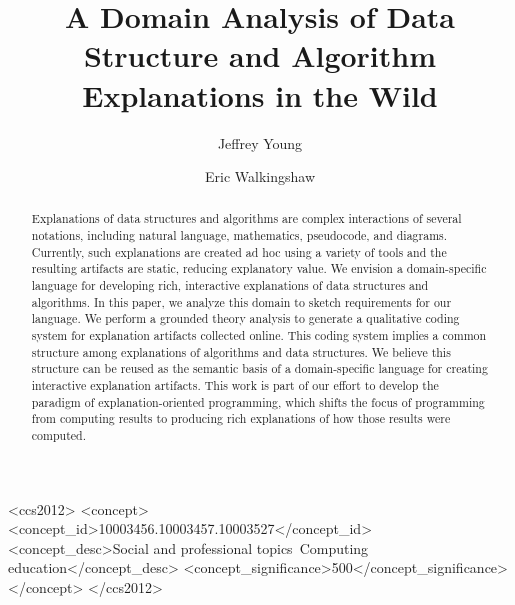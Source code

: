 \documentclass[sigconf]{acmart}
\begin{document}
\title{A Domain Analysis of Data Structure and Algorithm Explanations in the Wild}



% 

\begin{CCSXML}
<ccs2012>
<concept>
<concept_id>10003456.10003457.10003527</concept_id>
<concept_desc>Social and professional topics~Computing education</concept_desc>
<concept_significance>500</concept_significance>
</concept>
</ccs2012>
\end{CCSXML}



\author{Jeffrey Young} 
\author{Eric Walkingshaw} 

\begin{abstract}
%
Explanations of data structures and algorithms are complex interactions of
several notations, including natural language, mathematics, pseudocode, and
diagrams. Currently, such explanations are created ad hoc using a variety of
tools and the resulting artifacts are static, reducing explanatory value. We
envision a domain-specific language for developing rich, interactive
explanations of data structures and algorithms. In this paper, we analyze this
domain to sketch requirements for our language. We perform a grounded theory
analysis to generate a qualitative coding system for explanation artifacts
collected online. This coding system implies a common structure among
explanations of algorithms and data structures. We believe this structure can
be reused as the semantic basis of a domain-specific language for creating
interactive explanation artifacts. This work is part of our effort to develop
the paradigm of explanation-oriented programming, which shifts the focus of
programming from computing results to producing rich explanations of how those
results were computed.
%
\end{abstract}
\end{document}

